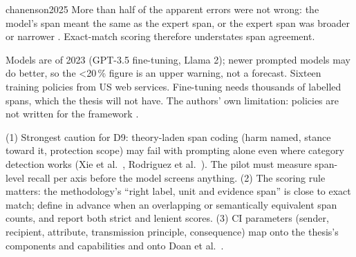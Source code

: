 \begin{papercard}{chanenson2025}
 More than half of the apparent errors were not wrong: the model's span meant the same as the expert span, or the expert span was broader or narrower . Exact-match scoring therefore understates span agreement.

 Models are of 2023 (GPT-3.5 fine-tuning, Llama 2); newer prompted models may do better, so the <20\,\% figure is an upper warning, not a forecast. Sixteen training policies from US web services. Fine-tuning needs thousands of labelled spans, which the thesis will not have. The authors' own limitation: policies are not written for the framework .

 (1) Strongest caution for D9: theory-laden span coding (harm named, stance toward it, protection scope) may fail with prompting alone even where category detection works (Xie et al.\ , Rodriguez et al.\ ). The pilot must measure span-level recall per axis before the model screens anything. (2) The scoring rule matters: the methodology's ``right label, unit and evidence span'' is close to exact match; define in advance when an overlapping or semantically equivalent span counts, and report both strict and lenient scores. (3) CI parameters (sender, recipient, attribute, transmission principle, consequence) map onto the thesis's components and capabilities and onto Doan et al.\ .
\end{papercard}
